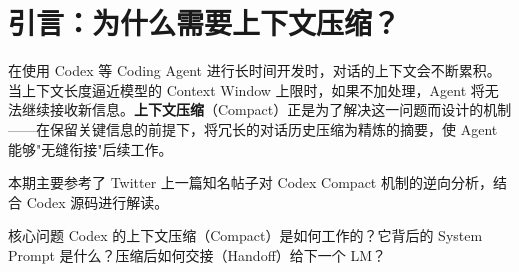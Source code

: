 \section{引言：为什么需要上下文压缩？}

在使用 Codex 等 Coding Agent 进行长时间开发时，对话的上下文会不断累积。当上下文长度逼近模型的 Context Window 上限时，如果不加处理，Agent 将无法继续接收新信息。\textbf{上下文压缩}（Compact）正是为了解决这一问题而设计的机制——在保留关键信息的前提下，将冗长的对话历史压缩为精炼的摘要，使 Agent 能够"无缝衔接"后续工作。

本期主要参考了 Twitter 上一篇知名帖子对 Codex Compact 机制的逆向分析，结合 Codex 源码进行解读。

\begin{knowledgebox}{核心问题}
Codex 的上下文压缩（Compact）是如何工作的？它背后的 System Prompt 是什么？压缩后如何交接（Handoff）给下一个 LM？
\end{knowledgebox}


